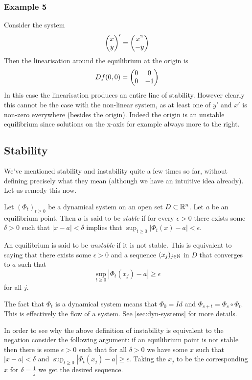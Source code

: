 \subsubsection{Example 5}
Consider the system
$$ \begin{pmatrix} x\\y \end{pmatrix}' = \begin{pmatrix} x^2\\-y \end{pmatrix} $$
Then the linearisation around the equilibrium at the origin is
$$ Df(0, 0) = \begin{pmatrix} 0 & 0\\0 & -1 \end{pmatrix} $$
In this case the linearisation produces an entire line of stability. However clearly this cannot be the case with the non-linear system, as at least one of $y'$ and $x'$ is non-zero everywhere (besides the origin). Indeed the origin is an unstable equilibrium since solutions on the x-axis for example always more to the right.

\subsection{Stability}
We've mentioned stability and instability quite a few times so far, without defining precisely what they mean (although we have an intuitive idea already). Let us remedy this now.
\begin{definition}
Let $(\Phi_t)_{t \geq 0}$ be a dynamical system on an open set $D \subset \mathbb{R}^n$. Let $a$ be an equilibrium point. Then $a$ is said to be \textit{stable} if for every $\epsilon > 0$ there exists some $\delta > 0$ such that $|x - a| < \delta$ implies that $\sup_{t \geq 0} \left| \Phi_t(x) - a \right| < \epsilon$.

An equilibrium is said to be \textit{unstable} if it is not stable. This is equivalent to saying that there exists some $\epsilon > 0$ and a sequence $(x_j)_{j \in \mathbb{N}}$ in $D$ that converges to $a$ such that
$$ \sup_{t \geq 0} \left| \Phi_t(x_j) - a \right| \geq \epsilon $$
for all $j$.
\end{definition}
\begin{remark}
    The fact that $\Phi_t$ is a dynamical system means that $\Phi_0 = Id$ and $\Phi_{s + t} = \Phi_s \circ \Phi_t$. This is effectively the flow of a system. See \autoref{sec:dyn-systems} for more details.
\end{remark}
\begin{remark}
    In order to see why the above definition of instability is equivalent to the negation consider the following argument: if an equilibrium point is not stable then there is some $\epsilon > 0$ such that for all $\delta > 0$ we have some $x$ such that $\left| x - a \right| < \delta$ and $\sup_{t \geq 0} \left| \Phi_t(x_j) - a \right| \geq \epsilon$. Taking the $x_j$ to be the corresponding $x$ for $\delta = \frac{1}{j}$ we get the desired sequence.
\end{remark}

